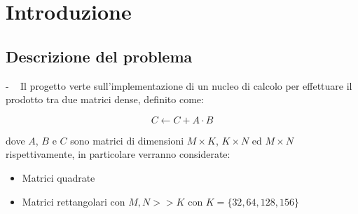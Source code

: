 \documentclass[compress]{beamer}
\begin{document}
\begin{frame}[plain]
    \titlepage
\end{frame}

\section{Introduzione}

\subsection{Descrizione del problema}
\begin{frame}{\secname \text{ }- \subsecname\ }
    Il progetto verte sull'implementazione di un nucleo di calcolo per effettuare il prodotto tra due matrici dense, definito come:
    \begin{Definition}
        \begin{equation}
            \label{eq:ce_ue}
            C\leftarrow C + A\cdot B
        \end{equation}
    \end{Definition}
    dove $A$, $B$ e $C$ sono matrici di dimensioni $M\times K$, $K\times N$ ed $M\times N$ rispettivamente, in particolare verranno considerate:
    \begin{itemize}
        \item Matrici quadrate
        \item Matrici rettangolari con $M,N>>K$ con $K=\{32, 64, 128, 156\}$
    \end{itemize}
\end{frame}
\end{document}
